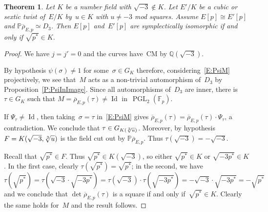 \documentclass[12pt, reqno]{amsart}
\newcommand{\F}{\mathbb{F}}
\newcommand{\PP}{\mathbb{P}}
\newcommand{\Q}{\mathbb{Q}}
\newcommand{\rhobar}{{\overline{\rho}}}
\newcommand{\PGL}{\operatorname{PGL}}
\DeclareMathOperator{\Id}{Id}
\numberwithin{equation}{section}
\newtheorem{theorem}{Theorem}[section]
\theoremstyle{definition}
\theoremstyle{remark}
\begin{document}
\begin{theorem}\label{T:cubicM} 
Let $K$ be a number field with $\sqrt{-3} \not\in K$. 
Let $E'/K$ be a cubic or sextic twist of~$E/K$ by~$u \in K$ with $u \neq -3$ mod squares. Assume $E[p] \cong E'[p]$
and $\PP \rhobar_{E,p} \simeq D_3$.
Then $E[p]$ and~$E'[p]$ are symplectically isomorphic if and only if
$\sqrt{p^*} \in K$.
\end{theorem}
\begin{proof} We have $j=j'=0$ and the curves have~CM by $\Q(\sqrt{-3})$.

By hypothesis $\psi(\sigma) \neq 1$ for some~$\sigma \in G_K$ therefore, 
considering~\eqref{E:PsiM} projectively, we see that~$M$ acts as a non-trivial automorphism of~$D_3$ by Proposition~\ref{P:PsiInImage}.
Since all automorphisms of~$D_3$ are inner, 
there is $\tau \in G_K$ such that 
$M = \rhobar_{E,p}(\tau) \neq \Id$ in~$\PGL_2(\F_p)$.

If $\Psi_\tau \neq \Id$, then   
taking~$\sigma = \tau$ in~\eqref{E:PsiM} 
gives
$\rhobar_{E,p}(\tau) = \rhobar_{E,p}(\tau) \cdot \Psi_\tau$, a contradiction. We conclude that
$\tau \in G_{K(\root3\of{u})}$. 
Moreover, by hypothesis
$F = K(\sqrt{-3},\root3\of{u})$ is
the field cut out by $\PP \rhobar_{E,p}$. 
Thus $\tau(\sqrt{-3}) = - \sqrt{-3}$.

Recall that $\sqrt{p^*} \in F$.
Thus $\sqrt{p^*} \in K(\sqrt{-3})$, so either $\sqrt{p^*} \in K$ or $\sqrt{-3p^*} \in K$. In the first case, clearly $\tau(\sqrt{p^*}) = \sqrt{p^*}$; in the second, we have 
\[
 \tau(\sqrt{p^*}) = \tau(\sqrt{-3}\cdot\sqrt{-3p^*}) = \tau(\sqrt{-3}) \cdot \tau(\sqrt{-3p^*})= - \sqrt{-3} \cdot \sqrt{-3p^*} = - \sqrt{p^*}
\]
and we conclude that $\det \rhobar_{E,p}(\tau)$ is a square if and only if~$\sqrt{p^*} \in K$. Clearly the same holds for~$M$ and the result follows.
\end{proof}
\end{document}
